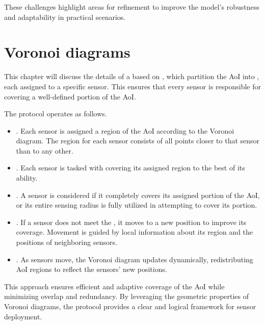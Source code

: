 \documentclass[a4paper, 12pt]{report}
\begin{document}
    These challenges highlight areas for refinement to improve the model's robustness and adaptability in practical scenarios.

    \section{Voronoi diagrams}

    This chapter will discuss the details of a  based on \href{https://en.wikipedia.org/wiki/Voronoi_diagram}{}, which partition the AoI into , each assigned to a specific sensor. This ensures that every sensor is responsible for covering a well-defined portion of the AoI.


    The protocol operates as follows.

    \begin{itemize}
        \item {}. Each sensor is assigned a region of the AoI according to the Voronoi diagram. The region for each sensor consists of all points closer to that sensor than to any other.  
        
        \item {}. Each sensor is tasked with covering its assigned region to the best of its ability.  
        
        \item {}. A sensor is considered  if it completely covers its assigned portion of the AoI, or its entire sensing radius is fully utilized in attempting to cover its portion.
        
        \item {}. If a sensor does not meet the , it moves to a new position to improve its coverage. Movement is guided by local information about its region and the positions of neighboring sensors.  
        
        \item {}. As sensors move, the Voronoi diagram updates dynamically, redistributing AoI regions to reflect the sensors' new positions.  
    \end{itemize}

    This approach ensures efficient and adaptive coverage of the AoI while minimizing overlap and redundancy. By leveraging the geometric properties of Voronoi diagrams, the protocol provides a clear and logical framework for sensor deployment.
\end{document}
